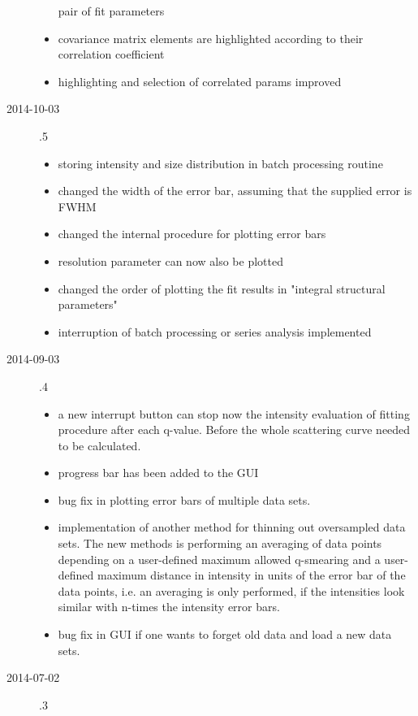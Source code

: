 \begin{description}
\begin{itemize}
             pair of fit parameters
        \item covariance matrix elements are highlighted according to their correlation
            coefficient
        \item highlighting and selection of correlated params improved
    \end{itemize}
\item[2014-10-03] .5
    \begin{itemize}
        \item storing intensity and size distribution in batch processing routine
        \item changed the width of the error bar, assuming that the supplied error is FWHM
        \item changed the internal procedure for plotting error bars
        \item resolution parameter can now also be plotted
        \item changed the order of plotting the fit results
            in "integral structural parameters"
        \item interruption of batch processing or series analysis implemented
    \end{itemize}
\item[2014-09-03] .4
    \begin{itemize}
    \item a new interrupt button can stop now the intensity evaluation of fitting
        procedure after each q-value. Before the whole scattering curve needed to be
        calculated.
    \item progress bar has been added to the GUI
    \item bug fix in plotting error bars of multiple data sets.
    \item implementation of another method for thinning out oversampled data sets. The
        new methods is performing an averaging of data points depending on a
        user-defined maximum allowed q-smearing and a user-defined maximum distance
        in intensity in units of the error bar of the data points, i.e. an averaging is
        only performed, if the intensities look similar with n-times the intensity
        error bars.
    \item bug fix in GUI if one wants to forget old data and load a new data sets.
    \end{itemize}
    \item[2014-07-02] .3
    \begin{itemize}

\end{itemize}
\end{description}
